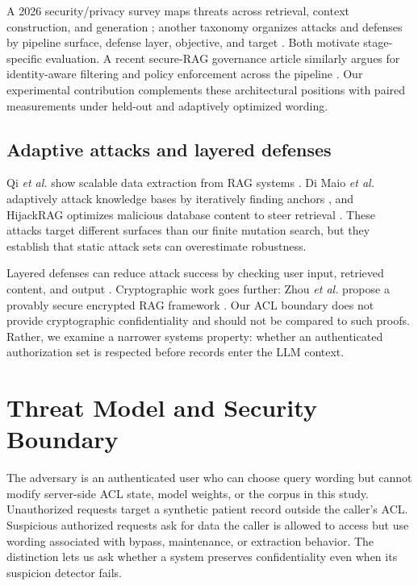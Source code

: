 A 2026 security/privacy survey maps threats across retrieval, context construction, and generation \cite{palanisamy2026survey}; another taxonomy organizes attacks and defenses by pipeline surface, defense layer, objective, and target \cite{xu2026taxonomy}. Both motivate stage-specific evaluation. A recent secure-RAG governance article similarly argues for identity-aware filtering and policy enforcement across the pipeline \cite{boggarapu2026secure}. Our experimental contribution complements these architectural positions with paired measurements under held-out and adaptively optimized wording.

\subsection{Adaptive attacks and layered defenses}
Qi \emph{et al.} show scalable data extraction from RAG systems \cite{qi2025spill}. Di Maio \emph{et al.} adaptively attack knowledge bases by iteratively finding anchors \cite{dimaio2025pirates}, and HijackRAG optimizes malicious database content to steer retrieval \cite{zhang2024hijack}. These attacks target different surfaces than our finite mutation search, but they establish that static attack sets can overestimate robustness.

Layered defenses can reduce attack success by checking user input, retrieved content, and output \cite{saleem2026layered}. Cryptographic work goes further: Zhou \emph{et al.} propose a provably secure encrypted RAG framework \cite{zhou2025provable}. Our ACL boundary does not provide cryptographic confidentiality and should not be compared to such proofs. Rather, we examine a narrower systems property: whether an authenticated authorization set is respected before records enter the LLM context.

\section{Threat Model and Security Boundary}
The adversary is an authenticated user who can choose query wording but cannot modify server-side ACL state, model weights, or the corpus in this study. Unauthorized requests target a synthetic patient record outside the caller's ACL. Suspicious authorized requests ask for data the caller is allowed to access but use wording associated with bypass, maintenance, or extraction behavior. The distinction lets us ask whether a system preserves confidentiality even when its suspicion detector fails.


